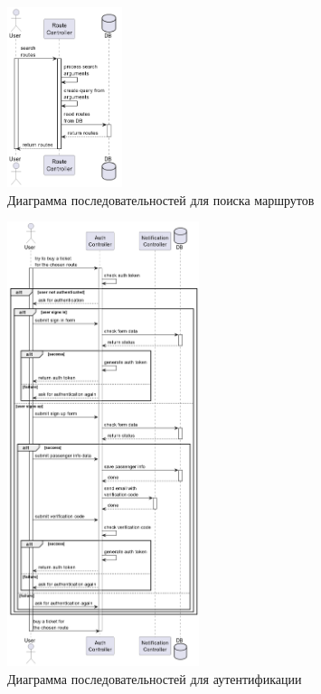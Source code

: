 \begin{figure}[H]
    \centering
    \includegraphics[width=0.3\textwidth]{model/search.png}
    \caption{Диаграмма последовательностей для поиска маршрутов}
\end{figure}

\newpage
\begin{figure}[H]
    \centering
    \includegraphics[width=0.5\textwidth]{model/auth.png}
    \caption{Диаграмма последовательностей для аутентификации}
\end{figure}

